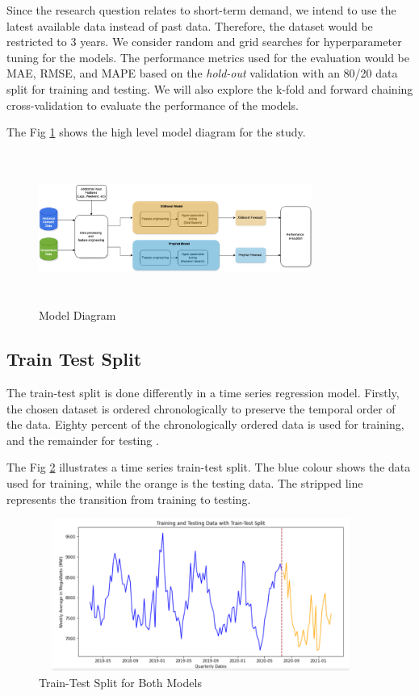 \documentclass[mstat,12pt]{unswthesis}
\begin{document}
Since the research question relates to short-term demand, we intend to
use the latest available data instead of past data. Therefore, the
dataset would be restricted to 3 years. We consider random and grid
searches for hyperparameter tuning for the models. The performance
metrics used for the evaluation would be MAE, RMSE, and MAPE based on
the \emph{hold-out} validation with an 80/20 data split for training and
testing. We will also explore the k-fold and forward chaining
cross-validation to evaluate the performance of the models.

The Fig \ref{model_diagram} shows the high level model diagram for the
study.

\begin{figure}[H]
\centering
\includegraphics[width=0.80\textwidth,height=5cm]{model_diagram.png}
\caption{Model Diagram}
\label{model_diagram}
\end{figure}

\hypertarget{train-test-split}{%
\subsection{Train Test Split}\label{train-test-split}}

The train-test split is done differently in a time series regression
model. Firstly, the chosen dataset is ordered chronologically to
preserve the temporal order of the data. Eighty percent of the
chronologically ordered data is used for training, and the remainder for
testing \cite{brownlee_2020_how}.

The Fig \ref{traintest} illustrates a time series train-test split. The
blue colour shows the data used for training, while the orange is the
testing data. The stripped line represents the transition from training
to testing.

\begin{figure}[H]
\centering
\includegraphics[width=0.95\textwidth, height=5cm]{traintest.png}
\caption{Train-Test Split for Both Models}\label{traintest}
\end{figure}
\end{document}
